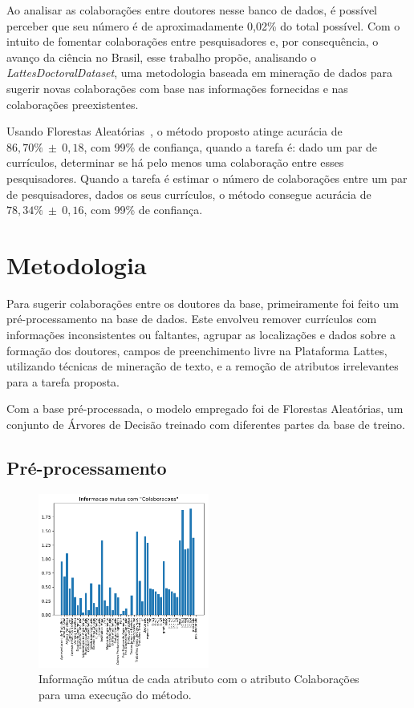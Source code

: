 \documentclass[12pt]{article}
\begin{document}
Ao analisar as colaborações entre doutores nesse banco de dados, é possível perceber que seu número é de aproximadamente 0,02\% do total possível.
Com o intuito de fomentar colaborações entre pesquisadores e, por consequência, o avanço da ciência no Brasil, esse trabalho propõe, analisando o \emph{LattesDoctoralDataset}, uma metodologia baseada em mineração de dados para sugerir novas colaborações com base nas informações fornecidas e nas colaborações preexistentes.

Usando Florestas Aleatórias~\cite{random-forests}, o método proposto atinge acurácia de $86,70\%~\pm~0,18$, com 99\% de confiança, quando a tarefa é: dado um par de currículos, determinar se há pelo menos uma colaboração entre esses pesquisadores.
Quando a tarefa é estimar o número de colaborações entre um par de pesquisadores, dados os seus currículos, o método consegue acurácia de $78,34\%~\pm~0,16$, com 99\% de confiança.

\section{Metodologia}
\label{sec:methods}

Para sugerir colaborações entre os doutores da base, primeiramente foi feito um pré-processamento na base de dados.
Este envolveu remover currículos com informações inconsistentes ou faltantes, agrupar as localizações e dados sobre a formação dos doutores, campos de preenchimento livre na Plataforma Lattes, utilizando técnicas de mineração de texto, e a remoção de atributos irrelevantes para a tarefa proposta.

Com a base pré-processada, o modelo empregado foi de Florestas Aleatórias, um conjunto de Árvores de Decisão treinado com diferentes partes da base de treino.

\subsection{Pré-processamento}
\label{sec:preprocess}

\begin{figure}
  \centering
  \includegraphics[width=0.5\textwidth]{graphs/mutual_information.pdf}
  \vspace{-15pt}
  \caption{Informação mútua de cada atributo com o atributo Colaborações para uma execução do método.}
  \label{fig:mutual-info}
\end{figure}
\end{document}
